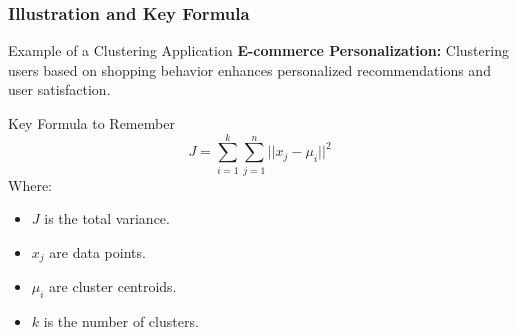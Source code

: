 \documentclass[aspectratio=169]{beamer}
\begin{document}
\begin{frame}[fragile]
    \frametitle{Illustration and Key Formula}
    \begin{block}{Example of a Clustering Application}
        \textbf{E-commerce Personalization:} Clustering users based on shopping behavior enhances personalized recommendations and user satisfaction.
    \end{block}

    \vspace{1em}

    \begin{block}{Key Formula to Remember}
        \begin{equation}
            J = \sum_{i=1}^{k} \sum_{j=1}^{n} ||x_j - \mu_i||^2
        \end{equation}
        Where:
        \begin{itemize}
            \item \( J \) is the total variance.
            \item \( x_j \) are data points.
            \item \( \mu_i \) are cluster centroids.
            \item \( k \) is the number of clusters.
        \end{itemize}
    \end{block}
\end{frame}
\end{document}
